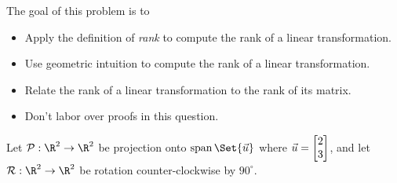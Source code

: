 	\question
	\begin{annotation}
		\begin{goals}

			The goal of this problem is to
			\begin{itemize}
				\item Apply the definition of \emph{rank} to compute the rank of a linear transformation.
				\item Use geometric intuition to compute the rank of a linear transformation.
				\item Relate the rank of a linear transformation to the rank of its matrix.
			\end{itemize}
		\end{goals}

		\begin{notes}
			\begin{itemize}
				\item Don't labor over proofs in this question.
			\end{itemize}
		\end{notes}
	\end{annotation}
	\label{rankOfMatricesAndTransformations}
	Let $\mathcal P:\R^2\to\R^2$ be projection onto $\Span\Set{\vec u}$ where $\vec u=\mat{2\\3}$,
	and let $\mathcal R:\R^2\to\R^2$ be rotation counter-clockwise by $90^\circ$.
